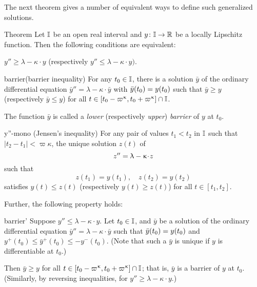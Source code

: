 The next theorem gives a  number of equivalent ways to define such  generalized solutions.

\begin{thm}{Theorem}\label{y''=<1-ky}
Let $\mathbb{I}$ be an open real interval and $y\:\II\to\RR$ be a locally Lipschitz function.
Then the following conditions are equivalent:
\begin{subthm}{}$y''\ge \lambda-\kappa\cdot  y$ (respectively $y''\le \lambda-\kappa\cdot  y).$
\end{subthm}

\begin{subthm}{barrier}(barrier inequality) For any $t_0\in \II$, 
there is a solution $\bar y$ 
of the ordinary differential equation $\bar y''=\lambda-\kappa\cdot  \bar y$ 
with $\bar y(t_0)\z= y(t_0)$ such that $\bar y\ge y$ (respectively $\bar y\le y$) for all $t\in [t_0-\varpi\kappa,t_0\z+\varpi\kappa]\cap \II$.

The function $\bar y$ is called a {}\emph{lower} (respectively {}\emph{upper}) \emph{barrier} of $y$ at $t_0$.
\end{subthm}



\begin{subthm}{y''-mono} (Jensen's inequality)
For any pair of values $t_1<t_2$ in $\mathbb{I}$ such that $|t_2-t_1|<\varpi\kappa$,  the unique solution $z(t)$ of \[z''\z=\lambda-\kappa\cdot  z\] such that
\[z(t_1)=y(t_1),\quad z(t_2)=y(t_2)\] 
satisfies $y(t)\le z(t)$ (respectively $y(t)\ge z(t)$) for all $t\in[t_1,t_2]$.
\end{subthm}

Further, the following property holds:

\begin{subthm}{barrier'} 
Suppose $y''\le \lambda-\kappa\cdot  y$. Let $t_0\in\II$, and   $\bar y$ be a solution of  the
 ordinary differential equation $\bar y''=\lambda-\kappa\cdot  \bar y$ 
such that  $\bar y(t_0)\z= y(t_0)$ and 
$y^+(t_0)\le \bar y^+(t_0)\le -y^-(t_0)$.
(Note that such a $\bar{y}$ is unique if $y$ is differentiable at $t_0$.) 

Then $\bar y\ge y$  for all $t\in [t_0-\varpi\kappa,t_0+\varpi\kappa]\cap \II$; that is, $\bar{y}$ is a barrier of $y$ at $t_0$. (Similarly, by reversing inequalities, for $y''\ge \lambda-\kappa\cdot  y$.) 
\end{subthm}
\end{thm}



